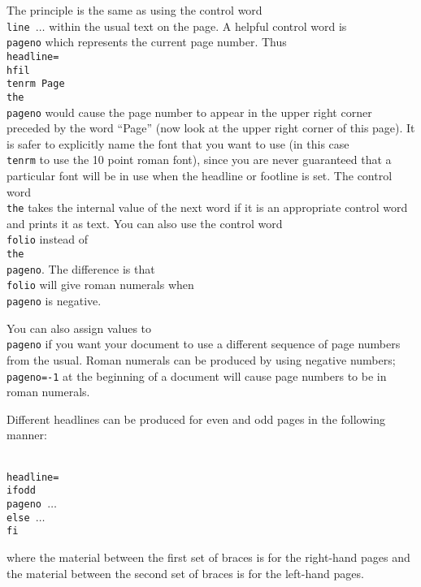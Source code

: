 The principle is the same as using the control word {\tt \\line\lb 
$\dots$\rb} within the usual text on the page.  A helpful 
control word is {\tt \\pageno} which represents the current page 
number. Thus {\tt \\headline=\lb\\hfil \\tenrm Page \\the\\pageno\rb} 
would cause the page number to appear in the upper 
right corner preceded by the word ``Page'' (now look at the upper 
right corner of this page). It is safer to explicitly name the 
font that you want to use (in this case {\tt \\tenrm} to use the 
10 point roman font), since you are never guaranteed that a 
particular font will be in use when the headline or footline is 
set. The control word {\tt \\the} takes the internal value of the 
next word if it is an appropriate control word and prints it as 
text. You can also use the control word {\tt \\folio} instead of 
{\tt \\the \\pageno}. The difference is that {\tt \\folio} will 
give roman numerals when {\tt \\pageno} is negative. 
 
You can also assign values to {\tt \\pageno} if you want your 
document to use a different sequence of page numbers from the 
usual.  Roman numerals can be produced by using negative numbers; 
{\tt \\pageno=-1} at the beginning of a document will cause page 
numbers to be in roman numerals. 
 
Different headlines can be produced for even and odd pages in 
the following manner: 
 
{\tt 
\\headline=\lb\\ifodd \\pageno \lb$\dots$\rb \\else \lb$\dots$\rb 
\\fi\rb} 
 
\noindent 
where the material between the first set of braces is for the 
right-hand pages and the material between the second set of 
braces is for the left-hand pages. 
 
